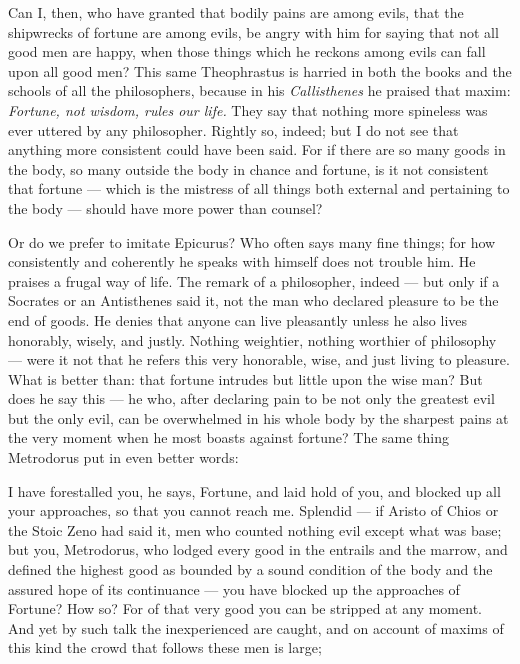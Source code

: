  Can I, then, who have granted that bodily pains are among evils, that the shipwrecks of fortune are among evils, be angry with him for saying that not all good men are happy, when those things which he reckons among evils can fall upon all good men? This same Theophrastus is harried in both the books and the schools of all the philosophers, because in his \textit{Callisthenes} he praised that maxim: \textit{Fortune, not wisdom, rules our life.} They say that nothing more spineless was ever uttered by any philosopher. Rightly so, indeed; but I do not see that anything more consistent could have been said. For if there are so many goods in the body, so many outside the body in chance and fortune, is it not consistent that fortune — which is the mistress of all things both external and pertaining to the body — should have more power than counsel?

 Or do we prefer to imitate Epicurus? Who often says many fine things; for how consistently and coherently he speaks with himself does not trouble him. He praises a frugal way of life. The remark of a philosopher, indeed — but only if a Socrates or an Antisthenes said it, not the man who declared pleasure to be the end of goods. He denies that anyone can live pleasantly unless he also lives honorably, wisely, and justly. Nothing weightier, nothing worthier of philosophy — were it not that he refers this very honorable, wise, and just living to pleasure. What is better than: that fortune intrudes but little upon the wise man? But does he say this — he who, after declaring pain to be not only the greatest evil but the only evil, can be overwhelmed in his whole body by the sharpest pains at the very moment when he most boasts against fortune? The same thing Metrodorus put in even better words:

 I have forestalled you, he says, Fortune, and laid hold of you, and blocked up all your approaches, so that you cannot reach me. Splendid — if Aristo of Chios or the Stoic Zeno had said it, men who counted nothing evil except what was base; but you, Metrodorus, who lodged every good in the entrails and the marrow, and defined the highest good as bounded by a sound condition of the body and the assured hope of its continuance — you have blocked up the approaches of Fortune? How so? For of that very good you can be stripped at any moment. And yet by such talk the inexperienced are caught, and on account of maxims of this kind the crowd that follows these men is large;

